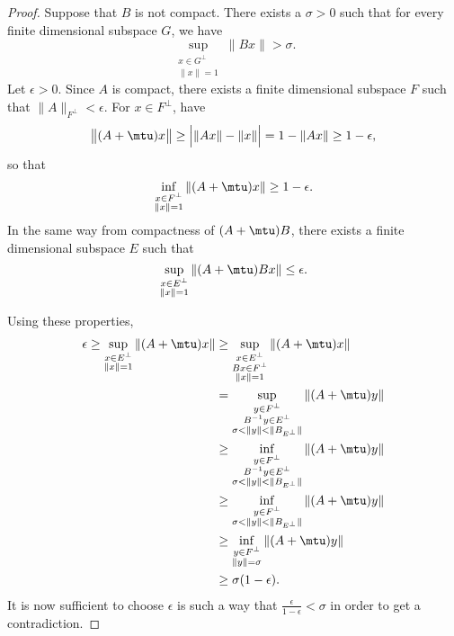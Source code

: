 \begin{proof}
	Suppose that $B$ is not compact. There exists a $\sigma>0$ such that for every finite dimensional subspace $G$, we have
	\begin{equation}
		\sup_{\substack{x\in G^{\perp}\\\| x \|=1}}\| Bx \|>\sigma.
	\end{equation}
	Let $\epsilon>0$. Since $A$ is compact, there exists a finite dimensional subspace $F$ such that $\| A \|_{F^{\perp}}<\epsilon$. For $x\in F^{\perp}$, have
	\begin{equation}
		\big\| (A+\mtu)x \big\|\geq\Big| \| Ax \|-\| x \| \Big|=1-\| Ax \|\geq 1-\epsilon,
	\end{equation}
	so that 
	\begin{equation}
		\inf_{\substack{x\in F^{\perp}\\\| x \|=1}}\| (A+\mtu)x \|\geq 1-\epsilon.
	\end{equation}
	In the same way from compactness of $(A+\mtu)B$, there exists a finite dimensional subspace $E$ such that
	\begin{equation}
		\sup_{\substack{x\in E^{\perp}\\\| x \|=1}}\| (A+\mtu)Bx \|\leq \epsilon.
	\end{equation}

	Using these properties,
	\begin{equation}
		\begin{aligned}[]
			\epsilon\geq\sup_{\substack{x\in E^{\perp}\\\| x \|=1}}\| (A+\mtu)x \|&\geq\sup_{\substack{x\in E^{\perp}\\ Bx\in F^{\perp}\\\| x \|=1}}\| (A+\mtu)x \|\\
			&=\sup_{\substack{y\in F^{\perp}\\B^{-1}y\in E^{\perp}\\\sigma<\| y \|<\| B_{E^{\perp}} \|}}\| (A+\mtu)y \|\\
			&\geq\inf_{\substack{y\in F^{\perp}\\B^{-1}y\in E^{\perp}\\\sigma<\| y \|<\| B_{E^{\perp}} \|}}\| (A+\mtu)y \|\\
			&\geq\inf_{\substack{y\in F^{\perp}\\\sigma<\| y \|<\| B_{E^{\perp}} \|}}\| (A+\mtu)y \|\\
			&\geq\inf_{\substack{y\in F^{\perp}\\\| y \|=\sigma}}\| (A+\mtu)y \|\\
			&\geq \sigma(1-\epsilon).
		\end{aligned}
	\end{equation}
	It is now sufficient to choose $\epsilon$ is such a way that $\frac{ \epsilon }{ 1-\epsilon }<\sigma$ in order to get a contradiction.
\end{proof}

